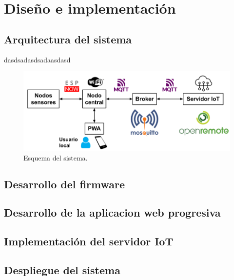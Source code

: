 \chapter{Diseño e implementación} %

\section{Arquitectura del sistema}
dasdsadasdsadaasdasd

\begin{figure}[H]
\centering 
\includegraphics[width=1\textwidth]{./Figures/arq_sistema.png}
\caption{Esquema del sistema.}
\label{fig:arqSistema}
\end{figure}

\section{Desarrollo del firmware}

\section{Desarrollo de la aplicacion web progresiva}

\section{Implementación del servidor IoT}

\section{Despliegue del sistema}



